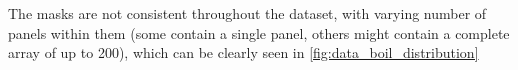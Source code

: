 \documentclass[conference]{IEEEtran}
\begin{document}

The masks are not consistent throughout the dataset, with varying number of panels within them (some contain a single panel, others might contain a complete array of up to 200), which can be clearly seen in \ref{fig:data_boil_distribution}
\end{document}
